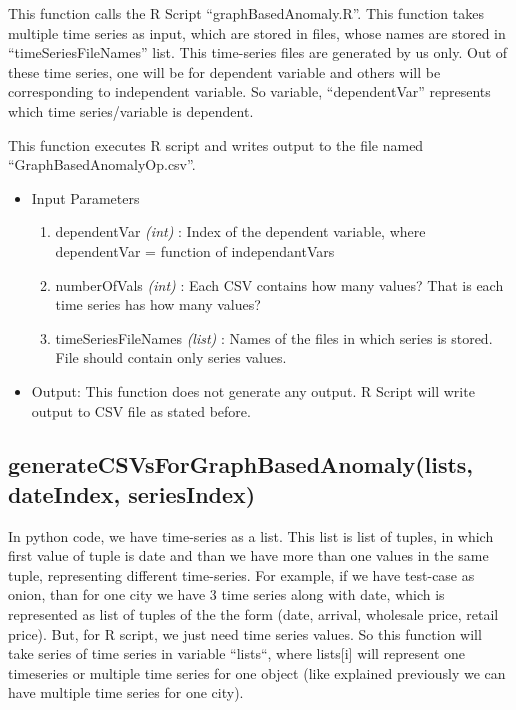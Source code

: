 This function calls the R Script ``graphBasedAnomaly.R''. This function takes 
multiple time series as input, which are stored in files, whose names are stored 
in ``timeSeriesFileNames'' list. This time-series files are generated by us 
only. Out of these time series, one will be for dependent variable and others 
will be corresponding to independent variable. So variable, ``dependentVar'' 
represents which time series/variable is dependent.

This function executes R script and writes output to the file named 
``GraphBasedAnomalyOp.csv''.

\begin{itemize}
 \item Input Parameters
 
 \begin{enumerate}
  \item dependentVar \textit{(int)} : Index of the dependent variable, where 
dependentVar = function of independantVars
  \item numberOfVals \textit{(int)} : Each CSV contains how many values? That 
is each time series has how many values?
  \item timeSeriesFileNames \textit{(list)} : Names of the files in which series 
is stored. File should contain only series values.

 \end{enumerate}

 \item Output: This function does not generate any output. R Script will write 
output to CSV file as stated before.

 
\end{itemize}


\subsection{generateCSVsForGraphBasedAnomaly(lists, dateIndex, seriesIndex)}

In python code, we have time-series as a list. This list is list of tuples, in 
which first value of tuple is date and than we have more than one values in the 
same tuple, representing different time-series. For example, if we have 
test-case as onion, than for one city we have 3 time series along with date, 
which is represented as list of tuples of the the form (date, arrival, wholesale 
price, retail price). But, for R script, we just need time series values. So 
this function will take series of time series in variable ``lists``, where 
lists[i] will represent one timeseries or multiple time series for one object 
(like explained previously we can have multiple time series for one city).


